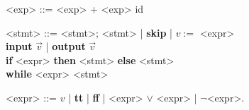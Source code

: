 

\shortverb{\|}
\setlength{\grammarindent}{2cm}
\newcommand{\indalt}[1][2]{\\\hspace*{#1em}\textbar\quad}



\begin{center}
	\begin{minipage}{\linewidth}
			\begin{grammar}
				<exp> ::= <exp> + <exp>
				\alt id
			\end{grammar}
			
	\end{minipage}
\end{center}

\begin{center}
  \begin{minipage}{0.8\linewidth}
    \begin{grammar}
      <stmt> ::= <stmt>; <stmt> | \textbf{skip} | $v := $ <expr>
      \indalt \textbf{input} $\vec{v}$ | \textbf{output} $\vec{v}$
      \indalt[4] \textbf{if} <expr> \textbf{then} <stmt> \textbf{else} <stmt>
      \indalt \textbf{while} <expr> <stmt>

      <expr> ::= $v$ | \textbf{tt} | \textbf{ff} | <expr> $\lor$
      <expr> | $\lnot$<expr>.
    \end{grammar}
  \end{minipage}
\end{center}

